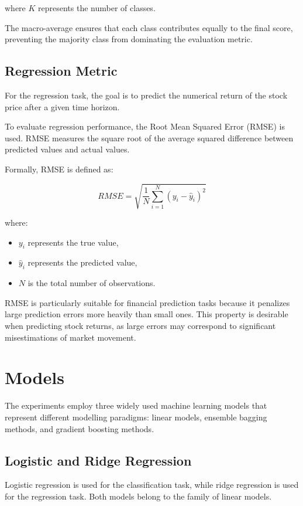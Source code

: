 where $K$ represents the number of classes.

The macro-average ensures that each class contributes equally to the final score, preventing the majority class from dominating the evaluation metric.

\subsection{Regression Metric}

For the regression task, the goal is to predict the numerical return of the stock price after a given time horizon.

To evaluate regression performance, the Root Mean Squared Error (RMSE) is used. RMSE measures the square root of the average squared difference between predicted values and actual values.

Formally, RMSE is defined as:

\begin{equation}
RMSE = \sqrt{\frac{1}{N} \sum_{i=1}^{N} (y_i - \hat{y}_i)^2}
\end{equation}

where:
\begin{itemize}
\item $y_i$ represents the true value,
\item $\hat{y}_i$ represents the predicted value,
\item $N$ is the total number of observations.
\end{itemize}

RMSE is particularly suitable for financial prediction tasks because it penalizes large prediction errors more heavily than small ones. This property is desirable when predicting stock returns, as large errors may correspond to significant misestimations of market movement.

\section{Models}

The experiments employ three widely used machine learning models that represent different modelling paradigms: linear models, ensemble bagging methods, and gradient boosting methods.

\subsection{Logistic and Ridge Regression}

Logistic regression is used for the classification task, while ridge regression is used for the regression task. Both models belong to the family of linear models.

